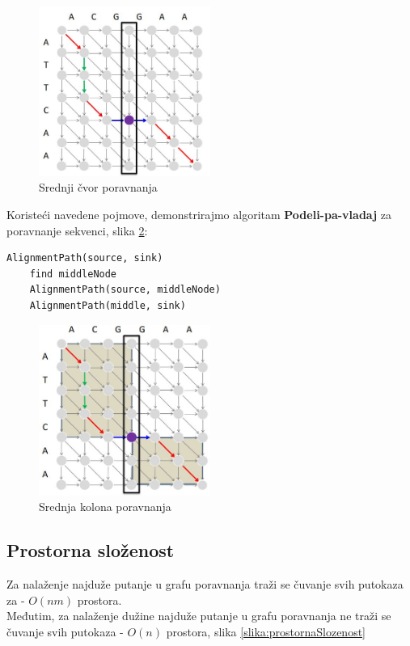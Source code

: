 \begin{figure}[h!]
\centering
\includegraphics[width=0.5\textwidth]{poglavlja/5/slike/srednjiCvor.JPG}
\caption{Srednji čvor poravnanja}
\label{slika:srednjiCvor}
\end{figure}

Koristeći navedene pojmove, demonstrirajmo algoritam \textbf{Podeli-pa-vladaj} za poravnanje sekvenci, slika \ref{slika:podeliPaVladaj}: \\

\begin{lstlisting}
AlignmentPath(source, sink)
    find middleNode
    AlignmentPath(source, middleNode)
    AlignmentPath(middle, sink)
\end{lstlisting}

\begin{figure}[h!]
\centering
\includegraphics[width=0.5\textwidth]{poglavlja/5/slike/podeliPaVladaj.JPG}
\caption{Srednja kolona poravnanja}
\label{slika:podeliPaVladaj}
\end{figure}

\subsection{Prostorna složenost}
Za nalaženje najduže putanje u grafu poravnanja traži se čuvanje svih putokaza za - $O(nm)$ prostora. \\
Međutim, za nalaženje dužine najduže putanje u grafu poravnanja ne traži se čuvanje svih putokaza - $O(n)$ prostora, slika \ref{slika:prostornaSlozenost}

